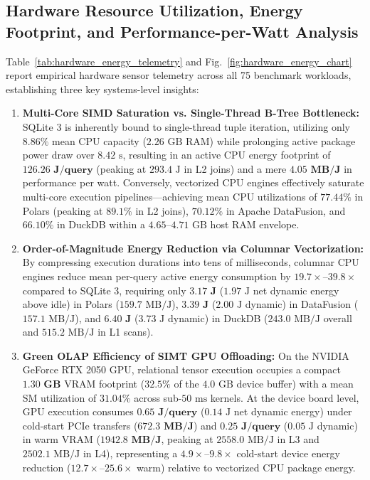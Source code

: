 \documentclass[10pt,a4paper]{article}
\begin{document}
\subsection{Hardware Resource Utilization, Energy Footprint, and Performance-per-Watt Analysis}
Table~\ref{tab:hardware_energy_telemetry} and Fig.~\ref{fig:hardware_energy_chart} report empirical hardware sensor telemetry across all 75 benchmark workloads, establishing three key systems-level insights:
\begin{enumerate}[leftmargin=1.5em,itemsep=2pt]
    \item \textbf{Multi-Core SIMD Saturation vs. Single-Thread B-Tree Bottleneck:} SQLite 3 is inherently bound to single-thread tuple iteration, utilizing only $8.86\%$ mean CPU capacity ($2.26\text{ GB}$ RAM) while prolonging active package power draw over $8.42\text{ s}$, resulting in an active CPU energy footprint of $\mathbf{126.26\text{ J/query}}$ (peaking at $293.4\text{ J}$ in L2 joins) and a mere $\mathbf{4.05\text{ MB/J}}$ in performance per watt. Conversely, vectorized CPU engines effectively saturate multi-core execution pipelines---achieving mean CPU utilizations of $\mathbf{77.44\%}$ in Polars (peaking at $89.1\%$ in L2 joins), $\mathbf{70.12\%}$ in Apache DataFusion, and $\mathbf{66.10\%}$ in DuckDB within a $4.65\text{--}4.71\text{ GB}$ host RAM envelope.
    \item \textbf{Order-of-Magnitude Energy Reduction via Columnar Vectorization:} By compressing execution durations into tens of milliseconds, columnar CPU engines reduce mean per-query active energy consumption by $19.7\times\text{--}39.8\times$ compared to SQLite 3, requiring only $\mathbf{3.17\text{ J}}$ ($1.97\text{ J}$ net dynamic energy above idle) in Polars ($159.7\text{ MB/J}$), $\mathbf{3.39\text{ J}}$ ($2.00\text{ J}$ dynamic) in DataFusion ($157.1\text{ MB/J}$), and $\mathbf{6.40\text{ J}}$ ($3.73\text{ J}$ dynamic) in DuckDB ($243.0\text{ MB/J}$ overall and $515.2\text{ MB/J}$ in L1 scans).
    \item \textbf{Green OLAP Efficiency of SIMT GPU Offloading:} On the NVIDIA GeForce RTX 2050 GPU, relational tensor execution occupies a compact $\mathbf{1.30\text{ GB}}$ VRAM footprint ($32.5\%$ of the $4.0\text{ GB}$ device buffer) with a mean SM utilization of $\mathbf{31.04\%}$ across sub-$50\text{ ms}$ kernels. At the device board level, GPU execution consumes $\mathbf{0.65\text{ J/query}}$ ($0.14\text{ J}$ net dynamic energy) under cold-start PCIe transfers ($\mathbf{672.3\text{ MB/J}}$) and $\mathbf{0.25\text{ J/query}}$ ($0.05\text{ J}$ dynamic) in warm VRAM ($\mathbf{1942.8\text{ MB/J}}$, peaking at $2558.0\text{ MB/J}$ in L3 and $2502.1\text{ MB/J}$ in L4), representing a $\mathbf{4.9\times\text{--}9.8\times}$ cold-start device energy reduction ($12.7\times\text{--}25.6\times$ warm) relative to vectorized CPU package energy.
\end{enumerate}
\end{document}
